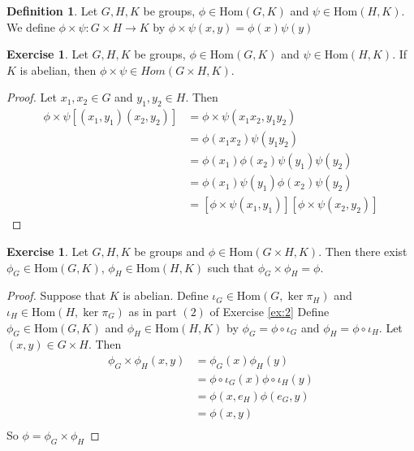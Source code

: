 \documentclass[12pt]{amsart}
\theoremstyle{definition}
\newtheorem{defn}[definition]{Definition}
\newtheorem{ex}[definition]{Exercise}
\newcommand{\Hom}{\text{Hom}}
\newcommand{\lex}[1]{\label{ex:#1}}
\newcommand{\rex}[1]{Exercise \ref{ex:#1}}
\begin{document}
	\begin{defn}
	Let $G,H, K$ be groups, $\phi \in \Hom(G,K)$ and $\psi \in \Hom(H, K)$. We define $\phi \times \psi: G \times H \rightarrow K$ by $\phi \times \psi(x,y) = \phi(x) \psi(y)$ 
	\end{defn}	
	
	\begin{ex}
	\lex{3} Let $G,H, K$ be groups, $\phi \in \Hom(G,K)$ and $\psi \in \Hom(H, K)$. If $K$ is abelian, then $\phi \times \psi \in Hom(G \times H,K)$.
	\end{ex}
	
	\begin{proof}
	Let $x_1, x_2 \in G$ and $y_1, y_2 \in H$. Then 
	\begin{align*}
	\phi \times \psi[(x_1, y_1)(x_2, y_2)] 
	&= \phi \times \psi (x_1x_2, y_1y_2) \\
	&= \phi(x_1x_2) \psi(y_1y_2) \\
	&= \phi(x_1)\phi(x_2)\psi(y_1)\psi(y_2) \\
	&= \phi(x_1)\psi(y_1)\phi(x_2)\psi(y_2) \\
	&= [\phi \times \psi(x_1, y_1)] [\phi \times \psi(x_2, y_2) ]
	\end{align*}
	\end{proof}
	
	\begin{ex}
	\lex{4} Let $G,H, K$ be groups and $\phi \in \Hom(G \times H, K)$. Then there exist $\phi_G \in \Hom(G,K)$, $\phi_H \in \Hom(H, K)$ such that $\phi_G \times \phi_H = \phi$.
	\end{ex}
	
	\begin{proof}
	Suppose that $K$ is abelian. Define $\iota_G \in \Hom(G, \ker \pi_H)$ and $\iota_H \in \Hom(H, \ker \pi_G)$ as in part $(2)$ of \rex{2} Define $\phi_G \in \Hom(G, K)$ and $\phi_H \in \Hom(H,K)$ by  $\phi_G = \phi \circ \iota_G$ and $\phi_H = \phi \circ \iota_H $. Let $(x,y) \in G \times H$. Then 
	\begin{align*}
	\phi_G \times \phi_H(x,y) 
	&= \phi_G(x) \phi_H(y) \\
	&= \phi \circ \iota_G(x) \phi \circ \iota_H(y) \\
	&= \phi(x, e_H)\phi(e_G, y) \\
	&= \phi(x,y) \\
	\end{align*}
	So $\phi = \phi_G \times \phi_H$
	\end{proof}
	
	
	
\end{document}
